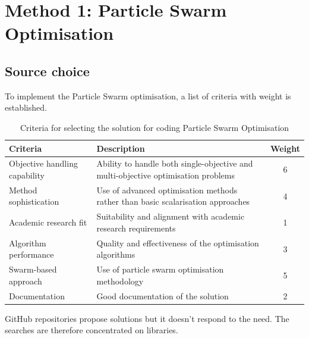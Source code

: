 \section{Method 1: Particle Swarm Optimisation}

\subsection{Source choice}

To implement the Particle Swarm optimisation, a list of criteria with weight is established.

\begin{table}[h!]
\centering
\caption{Criteria for selecting the solution for coding Particle Swarm Optimisation}
\begin{tabular}{|p{4cm}|p{8cm}|c|}
\hline
\textbf{Criteria} & \textbf{Description} & \textbf{Weight} \\ \hline
Objective handling capability & Ability to handle both single-objective and multi-objective optimisation problems & 6 \\ \hline
Method sophistication & Use of advanced optimisation methods rather than basic scalarisation approaches & 4 \\ \hline
Academic research fit & Suitability and alignment with academic research requirements & 1 \\ \hline
Algorithm performance & Quality and effectiveness of the optimisation algorithms & 3 \\ \hline
Swarm-based approach & Use of particle swarm optimisation methodology & 5 \\ \hline
Documentation & Good documentation of the solution & 2 \\ \hline
\end{tabular}
\end{table}

GitHub repositories propose solutions but it doesn't respond to the need. The searches are therefore concentrated on libraries.

